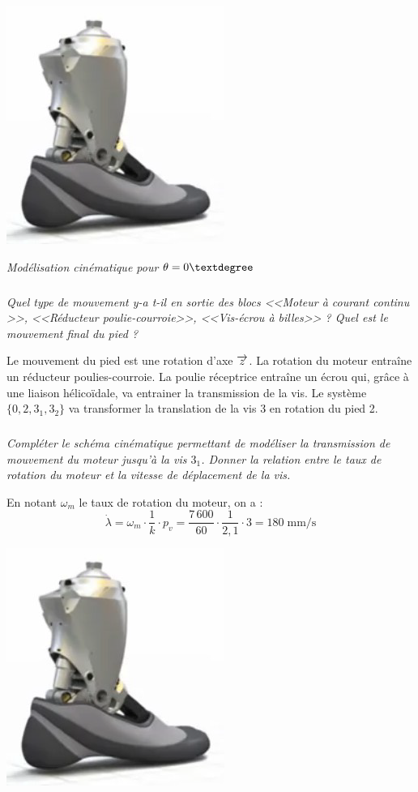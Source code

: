 \documentclass[10pt,fleqn]{article} %
\begin{document}
\begin{multicols}{2}
\begin{center}
\includegraphics[width=.48\textwidth]{images/prot_01}

\textit{Modélisation cinématique pour $\theta=0\textdegree$}
\end{center}
\fi


\subparagraph{}
\textit{Quel type de mouvement y-a t-il en sortie des blocs <<Moteur à courant continu >>, <<Réducteur poulie-courroie>>, <<Vis-écrou à billes>> ? Quel est le mouvement final du pied ?} 

\ifprof
\begin{corrige}
Le mouvement du pied est une rotation d'axe $\overrightarrow{z_{}}$. La rotation du moteur entraîne un réducteur poulies-courroie. La poulie réceptrice entraîne un écrou qui, grâce à une liaison hélicoïdale, va entrainer la transmission de la vis. Le système $\{0, 2, 3_1, 3_2\}$ va transformer la translation de la vis 3 en rotation du pied 2. 
\end{corrige}
\else
\fi

\subparagraph{}
\textit{Compléter le schéma cinématique permettant de modéliser la transmission de mouvement du moteur jusqu'à la vis $3_1$. Donner la relation entre le taux de rotation du moteur et la vitesse de déplacement de la vis.}



\ifprof
\begin{corrige}
En notant $\omega_m$ le taux de rotation du moteur, on a :
$$\dot{\lambda} = \omega_m \cdot \dfrac{1}{k}\cdot p_v  = 
 \dfrac{7\,600}{60} \cdot \dfrac{1}{2,1}\cdot 3=180 \; \text{mm/s}$$
 
 
\begin{center}
\includegraphics[width=.3\textwidth]{images/prot_01}
\end{center}
\end{corrige}
\else


\end{multicols}
\end{document}
